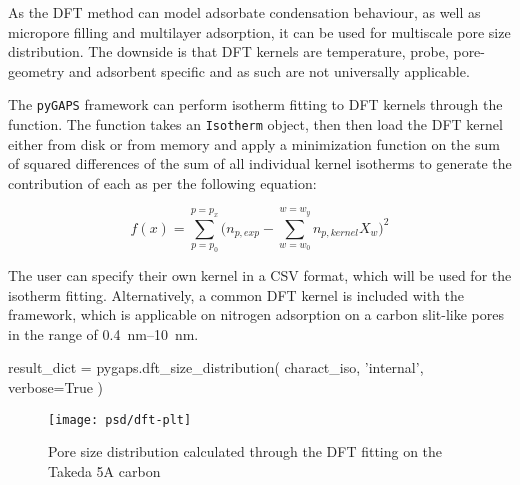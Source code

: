 As the DFT method can model adsorbate condensation behaviour,
as well as micropore filling and multilayer adsorption, it can 
be used for multiscale pore size distribution. The downside is
that DFT kernels are temperature, probe, pore-geometry and
adsorbent specific and as such are not universally applicable.

The \texttt{pyGAPS} framework can perform isotherm fitting to 
DFT kernels through the  function. 
The function takes an \texttt{Isotherm} object, then 
then load the DFT kernel either from disk or from memory and 
apply a minimization function on the sum of squared differences 
of the sum of all individual kernel isotherms to generate 
the contribution of each as per the following equation:

\begin{equation}
	f(x) = \sum_{p=p_0}^{p=p_x} \Big(n_{p,exp} - \sum_{w=w_0}^{w=w_y} n_{p, kernel} X_w \Big)^2
\end{equation}

The user can specify their own kernel in a CSV format, which will be
used for the isotherm fitting. Alternatively, a common DFT 
kernel is included with the framework, which is applicable on
nitrogen adsorption on a carbon slit-like pores in the range of
\SIrange{0.4}{10}{\nano\meter}.

\begin{python}[caption={DFT size distribution in pyGAPS},%
    label={pyg:lst:dft}]
result_dict = pygaps.dft_size_distribution(
    charact_iso,
    'internal',
    verbose=True
)
\end{python}
\begin{figure}[!htb]
	\texttt{[image: psd/dft-plt]}
	\caption{Pore size distribution calculated through the DFT fitting on the Takeda 5A carbon}%
	\label{fig:pyg:fig:dft}
\end{figure}